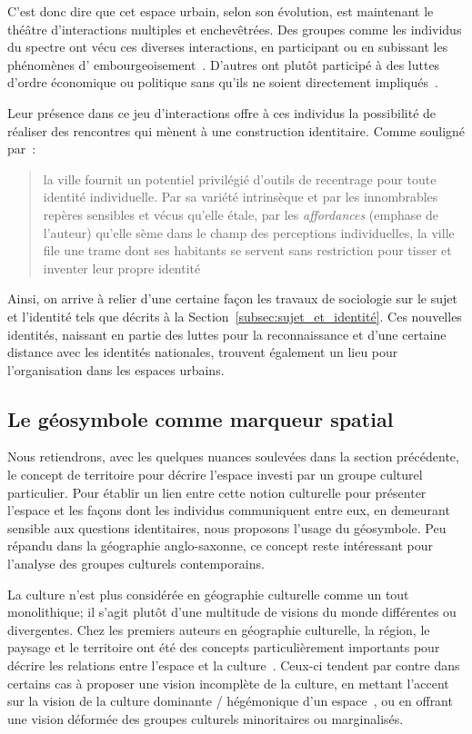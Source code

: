 C'est donc dire que cet espace urbain, selon son évolution, est maintenant le théâtre d'interactions multiples et enchevêtrées.
Des groupes comme les individus du spectre \lgbt{} ont vécu ces diverses interactions, en participant ou en subissant les phénomènes d’ embourgeoisement~\autocite{Podmore2001,Giraud2014,Hogan2005}.
D'autres ont plutôt participé à des luttes d'ordre économique ou politique sans qu'ils ne soient directement impliqués~\autocite{Kelliher2014}.

Leur présence dans ce jeu d'interactions offre à ces individus la possibilité de réaliser des rencontres qui mènent à une construction identitaire.
Comme souligné par~\citeauthor{DiMeo2007}: \blockquote[{\cite[81]{DiMeo2007}}][.]{\textelp{} la ville fournit un potentiel privilégié d’outils de recentrage pour toute identité individuelle. Par sa variété intrinsèque et par les innombrables repères sensibles et vécus qu’elle étale, par les \emph{affordances} (emphase de l'auteur) qu’elle sème dans le champ des perceptions individuelles, la ville file une trame dont ses habitants se servent sans restriction pour tisser et inventer leur propre identité}.

Ainsi, on arrive à relier d'une certaine façon les travaux de sociologie sur le sujet et l'identité tels que décrits à la Section~\ref{subsec:sujet_et_identité}.
Ces nouvelles identités, naissant en partie des luttes pour la reconnaissance et d'une certaine distance avec les identités nationales, trouvent également un lieu pour l'organisation dans les espaces urbains.

\subsection{Le géosymbole comme marqueur spatial}
\label{sec:le_symbole_comme_marqueur_spatial} Nous retiendrons, avec les quelques nuances soulevées dans la section précédente, le concept de territoire pour décrire l'espace investi par un groupe culturel particulier.
Pour établir un lien entre cette notion culturelle pour présenter l'espace et les façons dont les individus communiquent entre eux, en demeurant sensible aux questions identitaires, nous proposons l'usage du géosymbole.
Peu répandu dans la géographie anglo-saxonne, ce concept reste intéressant pour l'analyse des groupes culturels contemporains.

La culture n'est plus considérée en géographie culturelle comme un tout monolithique; il s'agit plutôt d'une multitude de visions du monde différentes ou divergentes.
Chez les premiers auteurs en géographie culturelle, la région, le paysage et le territoire ont été des concepts particulièrement importants  pour décrire les relations entre l'espace et la culture~\citep{Bonnemaison1981,Monnet1998,DiMeo1998,}.
Ceux-ci tendent par contre dans certains cas à proposer une vision incomplète de la culture, en mettant l'accent sur la vision de la culture dominante / hégémonique d'un espace~\citep[11-12]{Duncan1993}, ou en offrant une vision déformée des groupes culturels minoritaires ou marginalisés.

